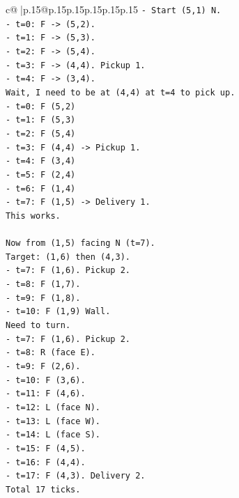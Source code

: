 \documentclass{article}
\begin{document}
{\begin{supertabular}{c@{$\;$}|p{.15\linewidth}@{}p{.15\linewidth}p{.15\linewidth}p{.15\linewidth}p{.15\linewidth}p{.15\linewidth}}
{{{\texttt{{-} Start (5,1) N.} \\
\texttt{{-} t=0: F {-}> (5,2).} \\
\texttt{{-} t=1: F {-}> (5,3).} \\
\texttt{{-} t=2: F {-}> (5,4).} \\
\texttt{{-} t=3: F {-}> (4,4). Pickup 1.} \\
\texttt{{-} t=4: F {-}> (3,4).} \\
\texttt{Wait, I need to be at (4,4) at t=4 to pick up.} \\
\texttt{{-} t=0: F (5,2)} \\
\texttt{{-} t=1: F (5,3)} \\
\texttt{{-} t=2: F (5,4)} \\
\texttt{{-} t=3: F (4,4) {-}> Pickup 1.} \\
\texttt{{-} t=4: F (3,4)} \\
\texttt{{-} t=5: F (2,4)} \\
\texttt{{-} t=6: F (1,4)} \\
\texttt{{-} t=7: F (1,5) {-}> Delivery 1.} \\
\texttt{This works.} \\
\\ 
\texttt{Now from (1,5) facing N (t=7).} \\
\texttt{Target: (1,6) then (4,3).} \\
\texttt{{-} t=7: F (1,6). Pickup 2.} \\
\texttt{{-} t=8: F (1,7).} \\
\texttt{{-} t=9: F (1,8).} \\
\texttt{{-} t=10: F (1,9) Wall.} \\
\texttt{Need to turn.} \\
\texttt{{-} t=7: F (1,6). Pickup 2.} \\
\texttt{{-} t=8: R (face E).} \\
\texttt{{-} t=9: F (2,6).} \\
\texttt{{-} t=10: F (3,6).} \\
\texttt{{-} t=11: F (4,6).} \\
\texttt{{-} t=12: L (face N).} \\
\texttt{{-} t=13: L (face W).} \\
\texttt{{-} t=14: L (face S).} \\
\texttt{{-} t=15: F (4,5).} \\
\texttt{{-} t=16: F (4,4).} \\
\texttt{{-} t=17: F (4,3). Delivery 2.} \\
\texttt{Total 17 ticks.} \\
}}}
\end{supertabular}}
\end{document}
